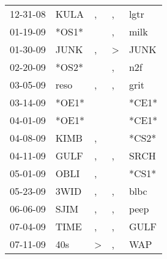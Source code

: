 \begin{supertabular}{p{0.07\textwidth}p{0.06\textwidth}p{0.02\textwidth}p{0.02\textwidth}p{0.06\textwidth}}
          12-31-08\textsuperscript{} &           KULA\textsuperscript{} &                , &                , &           lgtr\textsuperscript{} \\
          01-19-09\textsuperscript{} &                            *OS1* &                  &                , &           milk\textsuperscript{} \\
          01-30-09\textsuperscript{} &           JUNK\textsuperscript{} &                , &     \textgreater &           JUNK\textsuperscript{} \\
          02-20-09\textsuperscript{} &                            *OS2* &                  &                , &            n2f\textsuperscript{} \\
          03-05-09\textsuperscript{} &           reso\textsuperscript{} &                , &                , &           grit\textsuperscript{} \\
          03-14-09\textsuperscript{} &                            *OE1* &                  &                  &                            *CE1* \\
          04-01-09\textsuperscript{} &                            *OE1* &                  &                  &                            *CE1* \\
          04-08-09\textsuperscript{} &           KIMB\textsuperscript{} &                , &                  &                            *CS2* \\
          04-11-09\textsuperscript{} &           GULF\textsuperscript{} &                , &                , &           SRCH\textsuperscript{} \\
          05-01-09\textsuperscript{} &           OBLI\textsuperscript{} &                , &                  &                            *CS1* \\
          05-23-09\textsuperscript{} &           3WID\textsuperscript{} &                , &                , &           blbc\textsuperscript{} \\
          06-06-09\textsuperscript{} &           SJIM\textsuperscript{} &                , &                , &           peep\textsuperscript{} \\
          07-04-09\textsuperscript{} &           TIME\textsuperscript{} &                , &                , &           GULF\textsuperscript{} \\
          07-11-09\textsuperscript{} &            40s\textsuperscript{} &     \textgreater &                , &            WAP\textsuperscript{} \\

\end{supertabular}
